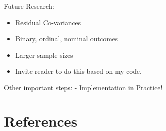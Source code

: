 \documentclass[
  man, donotrepeattitle,floatsintext]{apa6}
\providecommand{\tightlist}{%
  \setlength{\itemsep}{0pt}\setlength{\parskip}{0pt}}
\begin{document}
Future Research:

\begin{itemize}
\tightlist
\item
  Residual Co-variances
\item
  Binary, ordinal, nominal outcomes
\item
  Larger sample sizes
\item
  Invite reader to do this based on my code.
\end{itemize}

Other important steps:
- Implementation in Practice!

\clearpage

\hypertarget{references}{%
\section{References}\label{references}}

\begingroup
\setlength{\parindent}{-0.5in}
\setlength{\leftskip}{0.5in}
\end{document}
